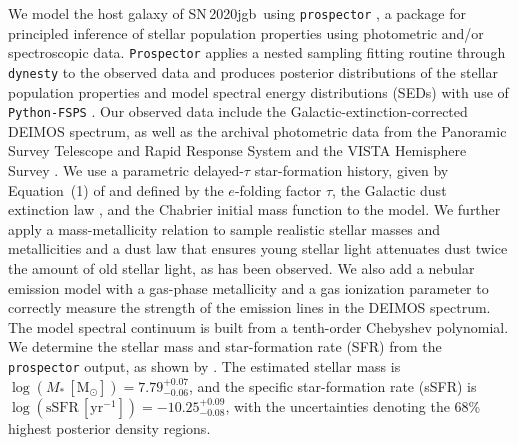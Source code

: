 \documentclass[twocolumn]{aastex631}
\newcommand{\sn}{SN\,2020jgb}
\begin{document}
\begin{CJK*}{UTF8}{gbsn}
We model the host galaxy of \sn\ using \texttt{prospector} \citep{Johnson_prospector_2021}, a package for principled inference of stellar population properties using photometric and/or spectroscopic data. \texttt{Prospector} applies a nested sampling fitting routine through \texttt{dynesty} \citep{Speagle_dynesty_2020} to the observed data and produces posterior distributions of the stellar population properties and model spectral energy distributions (SEDs) with use of \texttt{Python-FSPS} \citep{Conroy_2009,Conroy_2010}. Our observed data include the Galactic-extinction-corrected DEIMOS spectrum, as well as the archival photometric data from the Panoramic Survey Telescope and Rapid Response System \citep[Pan-STARRS;][$g$, $r$, $i$, $z$, $y$ Kron magnitudes]{PS1_2016}  and the VISTA Hemisphere Survey \citep[VHS;][$J$ and $K_s$ Petrosian magnitudes]{VHS_2013}. We use a parametric delayed-$\tau$ star-formation history, given by Equation~(1) of \citet{Nugent_2020} and defined by the $e$-folding factor $\tau$, the Galactic dust extinction law \citep{Cardelli_1989}, and the Chabrier initial mass function \citep{Chabrier_2003} to the model. We further apply a mass-metallicity relation \citep{Gallazzi_2005} to sample realistic stellar masses and metallicities and a dust law that ensures young stellar light attenuates dust twice the amount of old stellar light, as has been observed.  We also add a nebular emission model with a gas-phase metallicity and a gas ionization parameter to correctly measure the strength of the emission lines in the DEIMOS spectrum. The model spectral continuum is built from a tenth-order Chebyshev polynomial. We determine the stellar mass and star-formation rate (SFR) from the \texttt{prospector} output, as shown by \citet{Nugent_2022}. The estimated stellar mass is $\log (M_*\,[\mathrm{M_\odot}])=7.79_{-0.06}^{+0.07}$, and the specific star-formation rate (sSFR) is $\log (\mathrm{sSFR}\,[\mathrm{yr}^{-1}])=-10.25_{-0.08}^{+0.09}$, with the uncertainties denoting the 68\% highest posterior density regions.
  

\end{CJK*}
\end{document}
